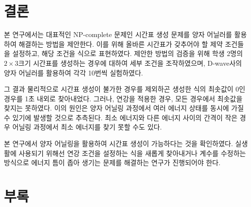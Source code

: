 \documentclass{article}
\begin{document}
    \section{결론}

본 연구에서는 대표적인 NP-complete 문제인 시간표 생성 문제를 양자 어닐러를 활용하여 해결하는 방법을 제안한다. 이를 위해 올바른 시간표가 갖추어야 할 제약 조건들을 설정하고, 해당 조건을 식으로 표현하였다. 제안한 방법의 검증을 위해 학생 2명의 $2\times3$크기 시간표를 생성하는 경우에 대하여 세부 조건을 조작하였으며, D-wave사의 양자 어닐러를 활용하여 각각 10번씩 실험하였다.

그 결과 물리적으로 시간표 생성이 불가한 경우를 제외하곤 생성한 식의 최솟값이 0인 경우를 1초 내외로 찾아내었다. 그러나, 연강을 적용한 경우, 모든 경우에서 최솟값을 찾지는 못하였다. 이의 원인은 양자 어닐링 과정에서 여러 에너지 상태를 동시에 가질 수 있기에 발생할 것으로 추측된다. 최소 에너지와 다른 에너지 사이의 간격이 작은 경우 어닐링 과정에서 최소 에너지를 찾기 못할 수도 있다.

본 연구에서 양자 어닐링을 활용하여 시간표 생성이 가능하다는 것을 확인하였다. 실생활에 사용되기 위해선 연강 조건을 설정하는 식을 새롭게 찾아내거나 계수를 수정하는 방식으로 에너지 틈이 좁아 생기는 문제를 해결하는 연구가 진행되어야 한다.

    \newpage
    
    
    
    \newpage
    \section{부록}\label{results}
\end{document}
